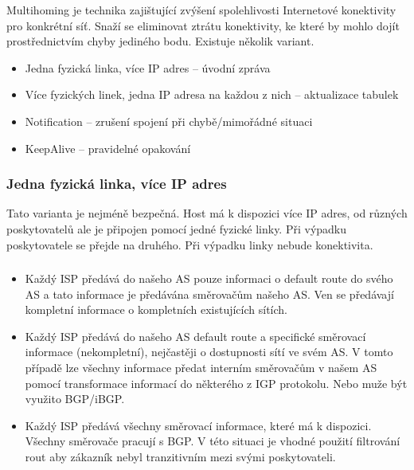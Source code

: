 Multihoming je technika zajištující zvýšení spolehlivosti Internetové konektivity pro konkrétní síť.
Snaží se eliminovat ztrátu konektivity, ke které by mohlo dojít prostřednictvím chyby jediného bodu.
Existuje několik variant.

\begin{itemize}[noitemsep]
        \item Jedna fyzická linka, více IP adres -- úvodní zpráva
        \item Více fyzických linek, jedna IP adresa na každou z nich -- aktualizace tabulek
        \item Notification -- zrušení spojení při chybě/mimořádné situaci
        \item KeepAlive -- pravidelné opakování
\end{itemize}

\subsubsection{Jedna fyzická linka, více IP adres}

Tato varianta je nejméně bezpečná.
Host má k dispozici více IP adres, od různých poskytovatelů ale je připojen pomocí jedné fyzické linky.
Při výpadku poskytovatele se přejde na druhého.
Při výpadku linky nebude konektivita.

\subsubsection{}
\begin{itemize}[noitemsep]
        \item Každý ISP předává do našeho AS pouze informaci o default route do svého AS a tato informace je předávána směrovačům našeho AS.
        Ven se předávají kompletní informace o kompletních existujících sítích.
        \item Každý ISP předává do našeho AS default route a specifické směrovací informace (nekompletní), nejčastěji o dostupnosti sítí ve svém AS.
        V tomto případě lze všechny informace předat interním směrovačům v našem AS pomocí transformace informací do některého z IGP protokolu.
        Nebo muže být využito BGP/iBGP.
        \item Každý ISP předává všechny směrovací informace, které má k dispozici.
        Všechny směrovače pracují s BGP.
        V této situaci je vhodné použití filtrování rout aby zákazník nebyl tranzitivním mezi svými poskytovateli.
\end{itemize}

